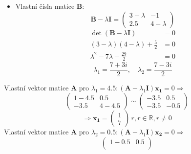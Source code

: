 \begin{mdframed}[style=mdexam]
\begin{example}
      \begin{itemize}
        \item Vlastní čísla matice \textbf{B}:
          \begin{equation*}
              \textbf{B} - \lambda\textbf{I}=
                \begin{pmatrix}
                  3-\lambda  & -1             \\
                  2.5        &  4-\lambda
                \end{pmatrix}
          \end{equation*}
          \begin{align*}
            \det(\mathbf{B}-\lambda\mathbf{I}) &= 0 \\
            (3-\lambda)(4-\lambda)+\frac{5}{2} &= 0 \\
            \lambda^2-7\lambda+\frac{29}{2}    &= 0
          \end{align*}
          \begin{equation*}
            \lambda_1 = \frac{7+3i}{2},\quad \lambda_2 = \frac{7-3i}{2}
          \end{equation*}
      \end{itemize}
    Vlastní vektor matice \(\mathbf{A}\) pro \(\lambda_1=4.5: (\mathbf{A} -
    \lambda_1\mathbf{I})\mathbf{x_1} = 0 \Rightarrow\)
    \begin{equation*}
      \begin{pmatrix}
        1  -4.5  &  0.5     \\
        -3.5     &  4-4.5
      \end{pmatrix}
      \sim
      \begin{pmatrix}
        -3.5  &  0.5         \\
        -3.5  & -0.5
      \end{pmatrix}
    \end{equation*}
    \begin{equation*}
      \Rightarrow\mathbf{x_1} =
      \begin{pmatrix}
        1 \\ 7
      \end{pmatrix}
      \, r, r\in\mathbb{R}, r\neq0
    \end{equation*}
    Vlastní vektor matice \(\mathbf{A}\) pro \(\lambda_2=0.5: (\mathbf{A} -
    \lambda_1\mathbf{I})\mathbf{x_2}=0 \Rightarrow\)
    \begin{equation*}
      \begin{pmatrix}
        1  -0.5  &  0.5   \\

\end{pmatrix}
\end{equation*}
\end{example}
\end{mdframed}
